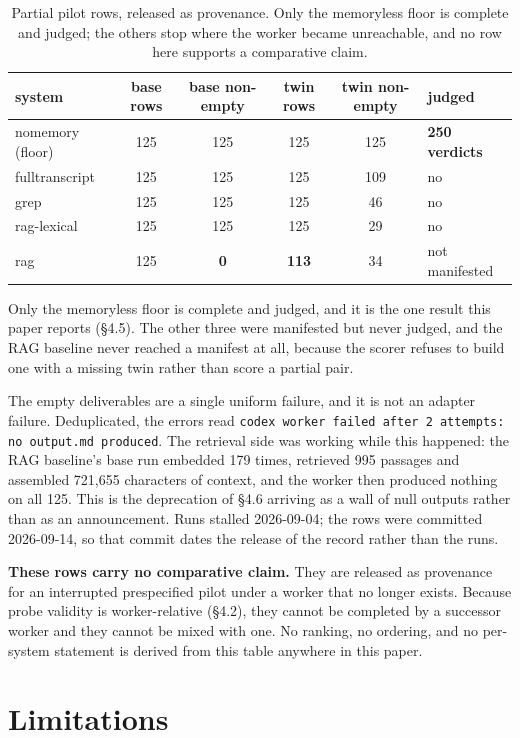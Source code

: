 \documentclass[11pt]{article}
\newcommand{\code}[1]{\texttt{\small #1}}
\begin{document}
\begin{table}[htb]
\centering\small
\caption{Partial pilot rows, released as provenance. Only the memoryless floor is
complete and judged; the others stop where the worker became unreachable, and no
row here supports a comparative claim.}
\label{tab:pilot}
\begin{tabular}{lccccl}
\toprule
system & base rows & base non-empty & twin rows & twin non-empty & judged\\
\midrule
nomemory (floor) & 125 & 125 & 125 & 125 & \textbf{250 verdicts}\\
fulltranscript & 125 & 125 & 125 & 109 & no\\
grep & 125 & 125 & 125 & 46 & no\\
rag-lexical & 125 & 125 & 125 & 29 & no\\
rag & 125 & \textbf{0} & \textbf{113} & 34 & not manifested\\
\bottomrule
\end{tabular}
\end{table}

Only the memoryless floor is complete and judged, and it is the one result this
paper reports (\S4.5). The other three were manifested but never judged, and the
RAG baseline never reached a manifest at all, because the scorer refuses to build
one with a missing twin rather than score a partial pair.

The empty deliverables are a single uniform failure, and it is not an adapter
failure. Deduplicated, the errors read \code{codex worker failed after 2 attempts:
no output.md produced}. The retrieval side was working while this happened: the
RAG baseline's base run embedded 179 times, retrieved 995 passages and assembled
721{,}655 characters of context, and the worker then produced nothing on all 125.
This is the deprecation of \S4.6 arriving as a wall of null outputs rather than as
an announcement. Runs stalled 2026-09-04; the rows were committed 2026-09-14, so
that commit dates the release of the record rather than the runs.

\textbf{These rows carry no comparative claim.} They are released as provenance
for an interrupted prespecified pilot under a worker that no longer exists.
Because probe validity is worker-relative (\S4.2), they cannot be completed by a
successor worker and they cannot be mixed with one. No ranking, no ordering, and
no per-system statement is derived from this table anywhere in this paper.

\section{Limitations}
\end{document}
